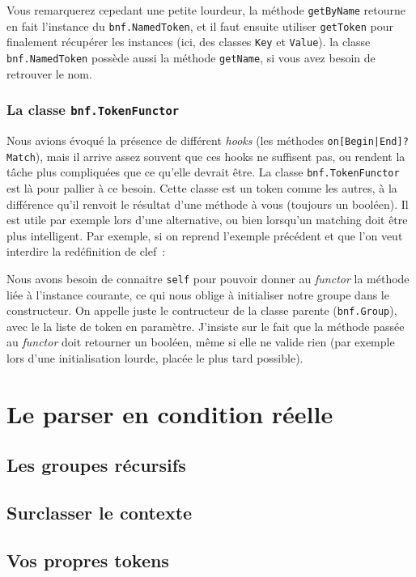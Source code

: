\documentclass[a4paper]{article}
\newcommand{\insertpython}[1]{%
{\ttfamily}%
}
\newcommand{\fixed}[1]{\texttt{#1}}
\begin{document}
                Vous remarquerez cepedant une petite lourdeur, la méthode \fixed{getByName}
                retourne en fait l'instance du \fixed{bnf.NamedToken}, et il faut ensuite
                utiliser \fixed{getToken} pour finalement récupérer les instances (ici, des
                classes \fixed{Key} et \fixed{Value}). la classe \fixed{bnf.NamedToken}
                possède aussi la méthode \fixed{getName}, si vous avez besoin de retrouver
                le nom.

            \subsubsection{La classe \fixed{bnf.TokenFunctor}}
                Nous avions évoqué la présence de différent \emph{hooks} (les méthodes \fixed{on[Begin|End]?Match}),
                mais il arrive assez souvent que ces hooks ne suffisent pas, ou rendent la tâche plus
                compliquées que ce qu'elle devrait être. La classe \fixed{bnf.TokenFunctor} est
                là pour pallier à ce besoin. Cette classe est un token comme les autres, à la différence qu'il
                renvoit le résultat d'une méthode à vous (toujours un booléen). Il est utile
                par exemple lors d'une alternative, ou bien lorsqu'un matching doit être plus intelligent.
                Par exemple, si on reprend l'exemple précédent et que l'on veut interdire la
                redéfinition de clef~:
                \insertpython{listings/bnf/ex08.py}
                Nous avons besoin de connaitre \fixed{self} pour pouvoir donner au \emph{functor} la
                méthode liée à l'instance courante, ce qui nous oblige à initialiser notre groupe dans
                le constructeur. On appelle juste le contructeur de la classe parente (\fixed{bnf.Group}),
                avec le la liste de token en paramètre. J'insiste sur le fait que la méthode passée
                au \emph{functor} doit retourner un booléen, même si elle ne valide rien (par
                exemple lors d'une initialisation lourde, placée le plus tard possible).




    \newpage
    \section{Le parser en condition réelle}
        \subsection{Les groupes récursifs}
        \subsection{Surclasser le contexte}
        \subsection{Vos propres tokens}
\end{document}
